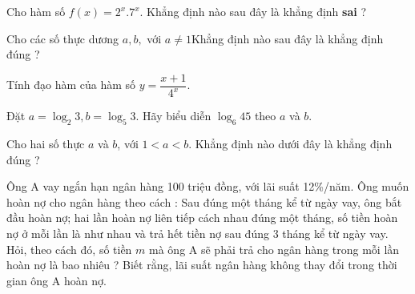 \begin{vnmultiplechoice}[ rearrange=yes, keycolumns=5]
\begin{question}%
Cho hàm số $f(x)=2^x.7^x$. Khẳng định nào sau đây là khẳng định \textbf{sai }?
\datcot
\bonpa
{}
{}
{}
{}
\end{question}


\begin{question} %
Cho các số thực dương $a, b,$ với $a\ne 1 $Khẳng định nào sau đây là khẳng định
đúng ?
\datcot[2]
\bonpa
{}
{}
{}
{}
\end{question}

\begin{question} %
Tính đạo hàm của hàm số $y=\dfrac{x+1}{4^x}$.
\datcot[2]
\bonpa
{}
{}
{}
{}
\end{question}


\begin{question}%
Đặt $a=\log_2 3, b=\log_5 3$. Hãy biểu diễn $\log_6 45$ theo $a$ và $b$.
\datcot[2]
\bonpa
{}
{}
{}
{}
\end{question}


\begin{question}%
Cho hai số thực $a$ và $b$, với $1<a<b$.  Khẳng định nào dưới đây là khẳng định
đúng ?
\datcot[2]
\bonpa
{}
{}
{}
{}
\end{question}


\begin{question}%
Ông A vay ngắn hạn ngân hàng 100 triệu đồng, với lãi suất 12\%/năm. Ông
muốn hoàn nợ cho ngân hàng theo cách : Sau đúng một tháng kể từ ngày vay, ông bắt
đầu hoàn nợ; hai lần hoàn nợ liên tiếp cách nhau đúng một tháng, số tiền hoàn nợ ở mỗi
lần là như nhau và trả hết tiền nợ sau đúng 3 tháng kể từ ngày vay. Hỏi, theo cách đó, số
tiền $m$ mà ông A sẽ phải trả cho ngân hàng trong mỗi lần hoàn nợ là bao nhiêu ? Biết
rằng, lãi suất ngân hàng không thay đổi trong thời gian ông A hoàn nợ.
\datcot
\bonpa
{}
{}
{}
{}
\end{question}


\end{vnmultiplechoice}
